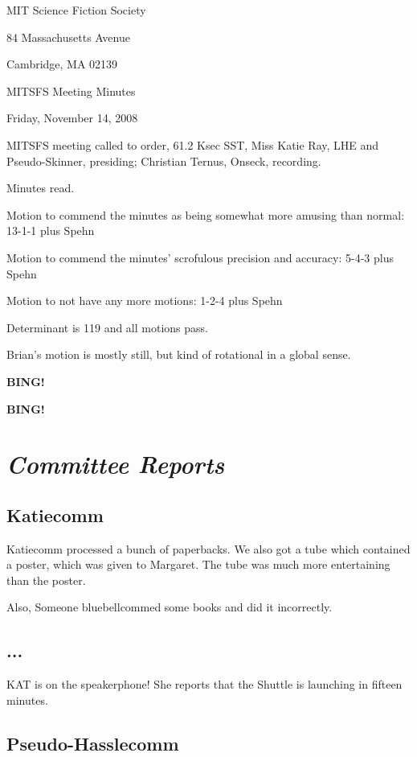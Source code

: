 \documentclass[10pt]{article}
\newcommand{\bing}{{\bf BING!} }
\newcommand{\goto}[1]{\bing \vskip 12pt \section*{{\em{#1}}}}
\newcommand{\ps}{ plus Spehn\xspace}
\begin{document}
\begin{center}

MIT Science Fiction Society

84 Massachusetts Avenue

Cambridge, MA 02139

\vspace{12pt}

MITSFS Meeting Minutes

Friday, November 14, 2008

\end{center}

\vspace{18pt}

\setlength{\parskip}{6pt}

\noindent
MITSFS meeting called to order, 61.2 Ksec SST,
Miss Katie Ray, LHE and Pseudo-Skinner, presiding; Christian Ternus, Onseck, recording.

Minutes read.

Motion to commend the minutes as being somewhat more amusing than normal: 13-1-1\ps

Motion to commend the minutes' scrofulous precision and accuracy: 5-4-3\ps

Motion to not have any more motions: 1-2-4\ps

Determinant is 119 and all motions pass.

Brian's motion is mostly still, but kind of rotational in a global sense.

\bing

\goto{Committee Reports}

\subsection*{Katiecomm}

Katiecomm processed a bunch of paperbacks.  We also got a tube which
contained a poster, which was given to Margaret.  The tube was much
more entertaining than the poster.

Also, Someone bluebellcommed some books and did it incorrectly.

\subsection*{...}

KAT is on the speakerphone!  She reports that the Shuttle is launching in fifteen minutes.

\subsection*{Pseudo-Hasslecomm}
\end{document}
